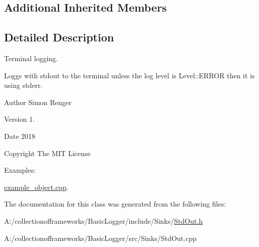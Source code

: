 \subsection*{Additional Inherited Members}


\subsection{Detailed Description}
Terminal logging. 

Loggs with {\ttfamily stdout} to the terminal unless the log level is {\ttfamily Level\+::\+E\+R\+R\+OR} then it is using {\ttfamily stderr}.

\begin{DoxyAuthor}{Author}
Simon Renger 
\end{DoxyAuthor}
\begin{DoxyVersion}{Version}
1. 
\end{DoxyVersion}
\begin{DoxyDate}{Date}
2018 
\end{DoxyDate}
\begin{DoxyCopyright}{Copyright}
The M\+IT License 
\end{DoxyCopyright}
\begin{Desc}
\item[Examples\+: ]\par
\hyperlink{example_object_8cpp-example}{example\+\_\+object.\+cpp}.\end{Desc}


The documentation for this class was generated from the following files\+:\begin{DoxyCompactItemize}
\item 
A\+:/collectionofframeworks/\+Basic\+Logger/include/\+Sinks/\hyperlink{_std_out_8h}{Std\+Out.\+h}\item 
A\+:/collectionofframeworks/\+Basic\+Logger/src/\+Sinks/Std\+Out.\+cpp\end{DoxyCompactItemize}
